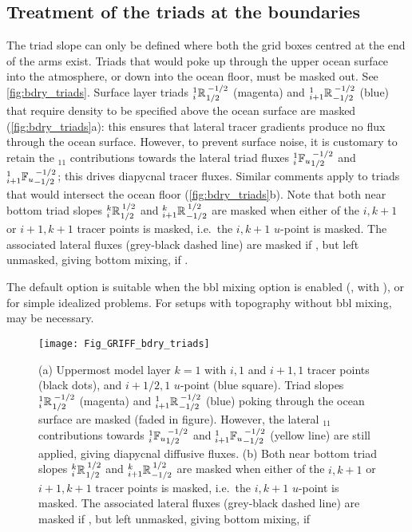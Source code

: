 \documentclass[../tex_main/NEMO_manual]{subfiles}
\begin{document}
\subsection{Treatment of the triads at the boundaries}\label{sec:iso_bdry}
The triad slope can only be defined where both the grid boxes centred at the end of the arms exist.
Triads that would poke up through the upper ocean surface into the atmosphere,
or down into the ocean floor, must be masked out.
See \autoref{fig:bdry_triads}.
Surface layer triads $\triad{i}{1}{R}{1/2}{-1/2}$ (magenta) and $\triad{i+1}{1}{R}{-1/2}{-1/2}$ (blue) that
require density to be specified above the ocean surface are masked (\autoref{fig:bdry_triads}a):
this ensures that lateral tracer gradients produce no flux through the ocean surface.
However, to prevent surface noise, it is customary to retain the $_{11}$ contributions towards
the lateral triad fluxes $\triad[u]{i}{1}{F}{1/2}{-1/2}$ and $\triad[u]{i+1}{1}{F}{-1/2}{-1/2}$;
this drives diapycnal tracer fluxes.
Similar comments apply to triads that would intersect the ocean floor (\autoref{fig:bdry_triads}b).
Note that both near bottom triad slopes $\triad{i}{k}{R}{1/2}{1/2}$ and
$\triad{i+1}{k}{R}{-1/2}{1/2}$ are masked when either of the $i,k+1$ or $i+1,k+1$ tracer points is masked,
i.e.\ the $i,k+1$ $u$-point is masked.
The associated lateral fluxes (grey-black dashed line) are masked if ,
but left unmasked, giving bottom mixing, if .

The default option  is suitable when the bbl mixing option is enabled
(, with ), or for simple idealized problems.
For setups with topography without bbl mixing,  may be necessary.
\begin{figure}[h] \begin{center}
    \texttt{[image: Fig\_GRIFF\_bdry\_triads]}
    \caption{  \protect\label{fig:bdry_triads}
      (a) Uppermost model layer $k=1$ with $i,1$ and $i+1,1$ tracer points (black dots),
      and $i+1/2,1$ $u$-point (blue square).
      Triad slopes $\triad{i}{1}{R}{1/2}{-1/2}$ (magenta) and $\triad{i+1}{1}{R}{-1/2}{-1/2}$ (blue) poking through
      the ocean surface are masked (faded in figure).
      However, the lateral $_{11}$ contributions towards $\triad[u]{i}{1}{F}{1/2}{-1/2}$ and
      $\triad[u]{i+1}{1}{F}{-1/2}{-1/2}$ (yellow line) are still applied,
      giving diapycnal diffusive fluxes.\newline
      (b) Both near bottom triad slopes $\triad{i}{k}{R}{1/2}{1/2}$ and
      $\triad{i+1}{k}{R}{-1/2}{1/2}$ are masked when either of the $i,k+1$ or $i+1,k+1$ tracer points is masked,
      i.e.\ the $i,k+1$ $u$-point is masked.
      The associated lateral fluxes (grey-black dashed line) are masked if
      \protect{}, but left unmasked,
      giving bottom mixing, if \protect{}}
 \end{center} \end{figure}
\end{document}
